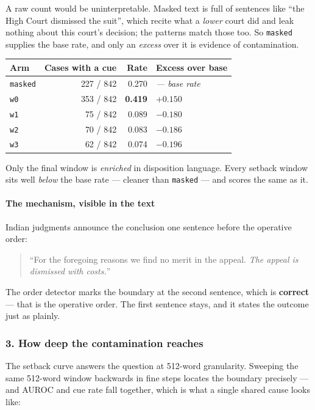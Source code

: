 \documentclass[12pt,a4paper]{article}
\newcommand{\code}[1]{\texttt{\small #1}}
\begin{document}
A raw count would be uninterpretable. Masked text is full of sentences like ``the High Court
dismissed the suit'', which recite what a \emph{lower} court did and leak nothing about this court's
decision; the patterns match those too. So \code{masked} supplies the base rate, and only an
\emph{excess} over it is evidence of contamination.

\begin{center}
\begin{tabular}{@{}lrrl@{}}
\toprule
\textbf{Arm} & \textbf{Cases with a cue} & \textbf{Rate} & \textbf{Excess over base} \\
\midrule
\code{masked} & 227 / 842 & 0.270 & \emph{--- base rate} \\
\code{w0} & 353 / 842 & \textbf{0.419} & $\mathbf{+0.150}$ \\
\code{w1} & 75 / 842 & 0.089 & $-0.180$ \\
\code{w2} & 70 / 842 & 0.083 & $-0.186$ \\
\code{w3} & 62 / 842 & 0.074 & $-0.196$ \\
\bottomrule
\end{tabular}
\end{center}

Only the final window is \emph{enriched} in disposition language. Every setback window sits well
\emph{below} the base rate --- cleaner than \code{masked} --- and scores the same as it.

\paragraph{The mechanism, visible in the text} Indian judgments announce the conclusion one sentence
before the operative order:

\begin{quote}
``For the foregoing reasons we find no merit in the appeal. \emph{The appeal is dismissed with
costs.}''
\end{quote}

The order detector marks the boundary at the second sentence, which is \textbf{correct} --- that is
the operative order. The first sentence stays, and it states the outcome just as plainly.

\subsubsection*{3. How deep the contamination reaches}

The setback curve answers the question at 512-word granularity. Sweeping the same 512-word window
backwards in fine steps locates the boundary precisely --- and AUROC and cue rate fall together,
which is what a single shared cause looks like:
\end{document}
